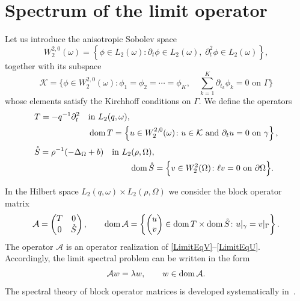 \documentclass[reqno]{amsart}
\theoremstyle{definition}
\theoremstyle{remark}
\numberwithin{equation}{section}
\newcommand{\dmn}{\mathop{\rm dom}}
\newcommand{\cA}{\mathcal{A}}
\newcommand{\cK}{\mathcal{K}}
\begin{document}
\section{Spectrum of the limit operator}\label{Section4}

Let us introduce the anisotropic Sobolev space
\begin{equation*}
W_2^{2,0}(\omega) = \left\{ \phi\in L_2(\omega)\colon
\partial_t\phi\in L_2(\omega),\; \partial_t^2\phi\in L_2(\omega)\right\},
\end{equation*}
together  with its subspace
\begin{equation*}
\cK= \Big\{\phi\in W_2^{2,0}(\omega)\colon \phi_1=\phi_2=\cdots=\phi_K, \quad \sum_{k=1}^K\partial_{t_k}\phi_k=0
\text{ on }\Gamma \Big\}
\end{equation*}
whose elements satisfy the Kirchhoff conditions on $\Gamma$. We define the operators
\begin{align}
&
\begin{aligned}\label{OperatorT}
 T=-q^{-1}\partial_t^2 \quad&\text{in }L_2(q,\omega),\\
&\dmn T =\left\{ u\in W_2^{2,0}(\omega)\colon u\in\cK
\text{ and } \partial_tu=0 \text{ on }\gamma\right\},
\end{aligned}
\\[1mm]
&\begin{aligned}\nonumber
  \mathring{S}=\rho^{-1}(-\Delta_\Omega+b) \quad\text{in }L_2(\rho,\Omega),&\\
\dmn\mathring{S}&=\Big\{v\in W_2^2(\Omega)\colon \ell v=0 \text{ on }\partial\Omega \Big\}. 
\end{aligned}
\end{align}

In the Hilbert space $L_2(q,\omega)\times L_2(\rho,\Omega)$ we consider the block operator matrix
\begin{equation*}
\cA=
\begin{pmatrix}
T & 0\\
0 & \mathring{S}
\end{pmatrix},\qquad
\dmn\cA = \left\{\begin{pmatrix}
                        u\\ v
                    \end{pmatrix}\in\dmn T\times\dmn\mathring{S}\colon u|_{\gamma}=v|_\Gamma \right\}.
\end{equation*}
The operator $\cA$ is an operator realization of   \eqref{LimitEqV}--\eqref{LimitEqU}.
 Accordingly, the limit spectral problem can be written in the form
\begin{equation*}
\cA w=\lambda w, \qquad w\in\dmn\cA.
\end{equation*}
The spectral theory of block operator matrices is developed systematically in~\cite{TretterBook}.
\end{document}
